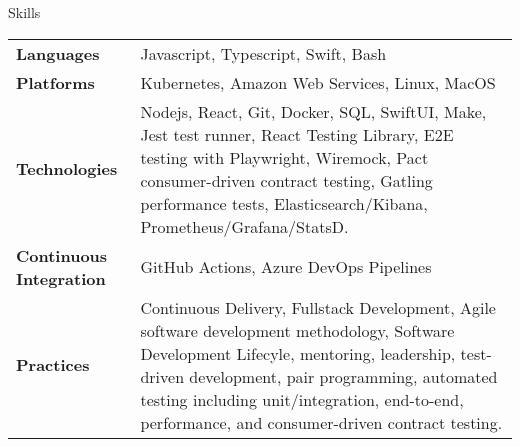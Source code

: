 \begin{section}{Skills}
  \begin{tabularx}{\linewidth}{@{}l X@{}}
    \textbf{Languages} &\small{Javascript, Typescript, Swift, Bash} \\
    \textbf{Platforms} &\small{Kubernetes, Amazon Web Services, Linux, MacOS} \\
    \textbf{Technologies} &\small{Nodejs, React, Git, Docker, SQL, SwiftUI, Make, Jest test runner, React Testing Library, E2E testing with Playwright, Wiremock, Pact consumer-driven contract testing, Gatling performance tests, Elasticsearch/Kibana, Prometheus/Grafana/StatsD.} \\
    \textbf{Continuous Integration} &\small{GitHub Actions, Azure DevOps Pipelines} \\
    \textbf{Practices} &\small{Continuous Delivery, Fullstack Development, Agile software development methodology, Software Development Lifecyle, mentoring, leadership, test-driven development, pair programming, automated testing including unit/integration, end-to-end, performance, and consumer-driven contract testing.} \\
  \end{tabularx}
\end{section}
